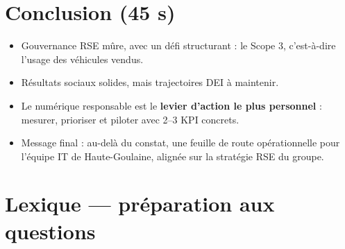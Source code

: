 \documentclass[12pt,a4paper]{article}
\begin{document}
\section*{Conclusion (45 s)}

\begin{itemize}
  \item Gouvernance RSE mûre, avec un défi structurant : le Scope 3, c'est-à-dire l'usage des véhicules vendus.
  \item Résultats sociaux solides, mais trajectoires DEI à maintenir.
  \item Le numérique responsable est le \textbf{levier d'action le plus personnel} : mesurer, prioriser et piloter avec 2--3 KPI concrets.
  \item Message final : au-delà du constat, une feuille de route opérationnelle pour l'équipe IT de Haute-Goulaine, alignée sur la stratégie RSE du groupe.
\end{itemize}

\section*{Lexique --- préparation aux questions}
\end{document}
